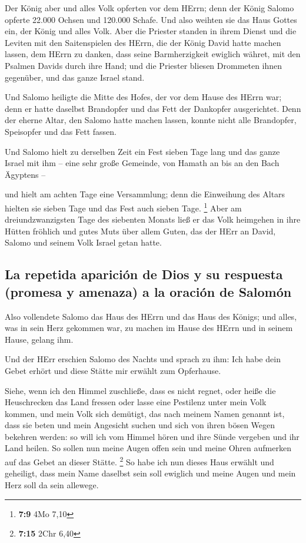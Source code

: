  Der König aber und alles Volk opferten vor dem HErrn;
 denn der König Salomo opferte 22.000 Ochsen und 120.000
Schafe. Und also weihten sie das Haus Gottes ein, der König und alles
Volk.  Aber die Priester standen in ihrem Dienst und die
Leviten mit den Saitenspielen des HErrn, die der König David hatte
machen lassen, dem HErrn zu danken, dass seine Barmherzigkeit ewiglich
währet, mit den Psalmen Davids durch ihre Hand; und die Priester bliesen
Drommeten ihnen gegenüber, und das ganze Israel stand.

 Und Salomo heiligte die Mitte des Hofes, der vor dem
Hause des HErrn war; denn er hatte daselbst Brandopfer und das Fett der
Dankopfer ausgerichtet. Denn der eherne Altar, den Salomo hatte machen
lassen, konnte nicht alle Brandopfer, Speisopfer und das Fett fassen.

 Und Salomo hielt zu derselben Zeit ein Fest sieben Tage
lang und das ganze Israel mit ihm -- eine sehr große Gemeinde, von
Hamath an bis an den Bach Ägyptens --

 und hielt am achten Tage eine Versammlung; denn die
Einweihung des Altars hielten sie sieben Tage und das Fest auch sieben
Tage. \footnote{\textbf{7:9} 4Mo 7,10}  Aber am
dreiundzwanzigsten Tage des siebenten Monats ließ er das Volk heimgehen
in ihre Hütten fröhlich und gutes Muts über allem Guten, das der HErr an
David, Salomo und seinem Volk Israel getan hatte.

\hypertarget{la-repetida-apariciuxf3n-de-dios-y-su-respuesta-promesa-y-amenaza-a-la-oraciuxf3n-de-salomuxf3n}{%
\subsection{La repetida aparición de Dios y su respuesta (promesa y
amenaza) a la oración de
Salomón}\label{la-repetida-apariciuxf3n-de-dios-y-su-respuesta-promesa-y-amenaza-a-la-oraciuxf3n-de-salomuxf3n}}

 Also vollendete Salomo das Haus des HErrn und das Haus
des Königs; und alles, was in sein Herz gekommen war, zu machen im Hause
des HErrn und in seinem Hause, gelang ihm.

 Und der HErr erschien Salomo des Nachts und sprach zu
ihm: Ich habe dein Gebet erhört und diese Stätte mir erwählt zum
Opferhause.

 Siehe, wenn ich den Himmel zuschließe, dass es nicht
regnet, oder heiße die Heuschrecken das Land fressen oder lasse eine
Pestilenz unter mein Volk kommen,  und mein Volk sich
demütigt, das nach meinem Namen genannt ist, dass sie beten und mein
Angesicht suchen und sich von ihren bösen Wegen bekehren werden: so will
ich vom Himmel hören und ihre Sünde vergeben und ihr Land heilen.
 So sollen nun meine Augen offen sein und meine Ohren
aufmerken auf das Gebet an dieser Stätte. \footnote{\textbf{7:15} 2Chr
  6,40}  So habe ich nun dieses Haus erwählt und
geheiligt, dass mein Name daselbst sein soll ewiglich und meine Augen
und mein Herz soll da sein allewege.

